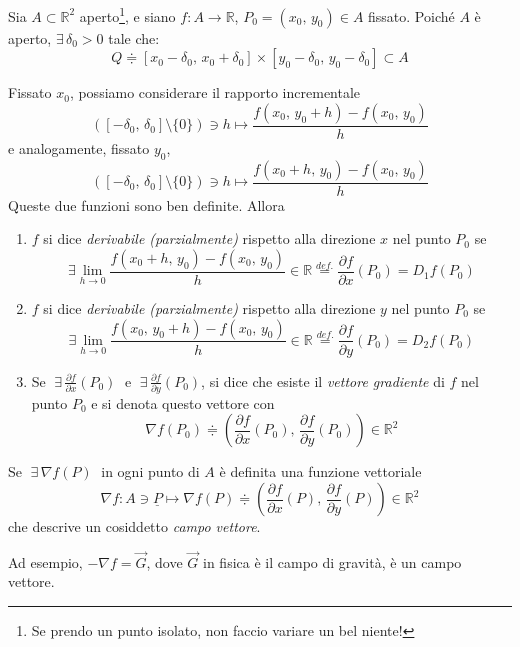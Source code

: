 \begin{definition}
Sia $A \subset \mathbb{R}^2$ aperto\footnote{Se prendo un punto isolato, non faccio variare un bel niente!}, e siano $f:A \longrightarrow \mathbb{R}$, $P_0 = (x_0,\,y_0) \in A$ fissato. Poiché $A$ è aperto, $\exists \, \delta_0 > 0$ tale che:
$$Q \doteqdot \left[ x_0-\delta_0,\,x_0+\delta_0 \right] \times \left[ y_0-\delta_0,\,y_0-\delta_0 \right] \subset A$$
\begin{center}
\def\svgwidth{7cm}

\end{center}
Fissato $x_0$, possiamo considerare il rapporto incrementale
$$
\left( \left[ -\delta_0,\,\delta_0 \right] \setminus \lbrace 0 \rbrace \right) \ni h \longmapsto
\frac{f(x_0,\,y_0+h)-f(x_0,\,y_0)}{h}
$$
e analogamente, fissato $y_0$,
$$
\left( \left[ -\delta_0,\,\delta_0 \right] \setminus \lbrace 0 \rbrace \right) \ni h \longmapsto
\frac{f(x_0+h,\,y_0)-f(x_0,\,y_0)}{h}
$$
Queste due funzioni sono ben definite. Allora
\begin{enumerate}[labelindent=\parindent,leftmargin=*,label=\textnormal{(\roman*)},start=1]
\item $f$ si dice \emph{derivabile (parzialmente)} rispetto alla direzione $x$ nel punto $P_0$ se
$$
\exists \lim_{h \rightarrow 0} \frac{f(x_0+h,\,y_0)-f(x_0,\,y_0)}{h} \in \mathbb{R}
\overset{def.}{=}
\frac{\partial f}{\partial x}(P_0) = D_1 f(P_0)
$$
\item $f$ si dice \emph{derivabile (parzialmente)} rispetto alla direzione $y$ nel punto $P_0$ se
$$
\exists \lim_{h \rightarrow 0} \frac{f(x_0,\,y_0+h)-f(x_0,\,y_0)}{h} \in \mathbb{R}
\overset{def.}{=}
\frac{\partial f}{\partial y}(P_0) = D_2 f(P_0)
$$
\item Se $\; \displaystyle \exists \, \frac{\partial f}{\partial x}(P_0) \;$ e $\; \displaystyle \exists \, \frac{\partial f}{\partial y}(P_0)$, si dice che esiste il \emph{vettore gradiente} di $f$ nel punto $P_0$ e si denota questo vettore con
$$
\nabla f(P_0) \doteqdot \left( \frac{\partial f}{\partial x}(P_0),\,\frac{\partial f}{\partial y}(P_0) \right) \in \mathbb{R}^2
$$
\end{enumerate}
\end{definition}

\begin{obs}
Se $\; \exists \, \nabla f(P) \;$ in ogni punto di $A$ è definita una funzione vettoriale
$$\nabla f : A \ni \underline{P} \longmapsto \nabla f(P) \doteqdot \left( \frac{\partial f}{\partial x}(P),\,\frac{\partial f}{\partial y}(P) \right) \in \mathbb{R}^2$$
che descrive un cosiddetto \emph{campo vettore}.

Ad esempio, $- \nabla f = \overset{\rightarrow}{G}$, dove $\overset{\rightarrow}{G}$ in fisica è il campo di gravità, è un campo vettore.
\end{obs}

